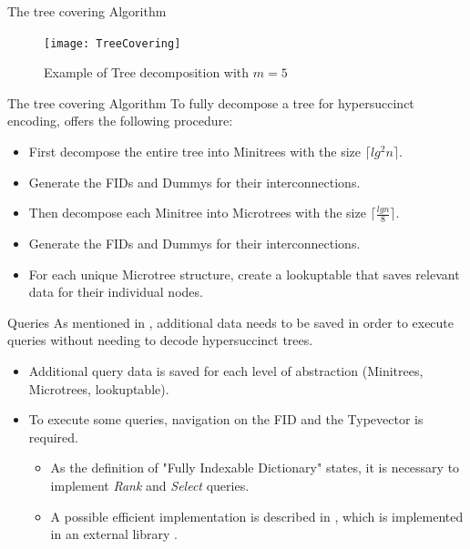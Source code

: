 \documentclass{beamer}
\begin{document}
\begin{frame}{The tree covering Algorithm}
\begin{figure}[t]
	\texttt{[image: TreeCovering]}
\caption{Example of Tree decomposition with $m = 5$ \cite{farzanMunro}}
\end{figure}
\end{frame}

\begin{frame}{The tree covering Algorithm}
	To fully decompose a tree for hypersuccinct encoding, \cite{farzanMunro} offers the following procedure:
	\begin{itemize}
	\item
		First decompose the entire tree into Minitrees with the size $\lceil lg^{2} n \rceil$.
	\item
		Generate the FIDs and Dummys for their interconnections.
	\item
		Then decompose each Minitree into Microtrees with the size $\lceil \frac{lg n}{8} \rceil$.
	\item
		Generate the FIDs and Dummys for their interconnections.
	\item
		For each unique Microtree structure, create a lookuptable that saves relevant data for their individual nodes.
	\end{itemize}
\end{frame}

\begin{frame}{Queries}
	As mentioned in \cite{farzanMunro}, additional data needs to be saved in order to execute queries without needing to decode hypersuccinct trees.
	\begin{itemize}
	\item
		Additional query data is saved for each level of abstraction (Minitrees, Microtrees, lookuptable).
	\item
		To execute some queries, navigation on the FID and the Typevector is required.
		\begin{itemize}
			\item
				As the definition of "Fully Indexable Dictionary" states, it is necessary to implement \textit{Rank} and \textit{Select} queries.
			\item
				A possible efficient implementation is described in \cite{succinctBV}, which is implemented in an external library \cite{succinctBVLink}.
		\end{itemize}
	\end{itemize}
\end{frame}
\end{document}

